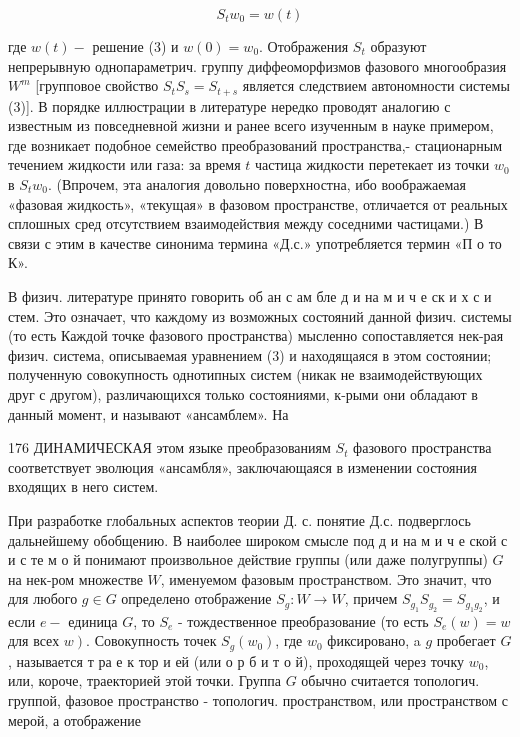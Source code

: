 \documentclass[10pt]{article}
\begin{document}
\[

S_{t} w_{0}=w(t)

\]



где $w(t)-$ решение (3) и $w(0)=w_{0}$. Отображения $S_{t}$ образуют непрерывную однопараметрич. группу диффеоморфизмов фазового многообразия $W^{m}$ [групповое свойство $S_{t} S_{s}=S_{t+s}$ является следствием автономности системы (3)]. В порядке иллюстрации в литературе нередко проводят аналогию с известным из повседневной жизни и ранее всего изученным в науке примером, где возникает подобное семейство преобразований пространства,- стационарным течением жидкости или газа: за время $t$ частица жидкости перетекает из точки $w_{0}$ в $S_{t} w_{0}$. (Впрочем, эта аналогия довольно поверхностна, ибо воображаемая «фазовая жидкость», «текущая» в фазовом пространстве, отличается от реальных сплошных сред отсутствием взаимодействия между соседними частицами.) В связи с этим в качестве синонима термина «Д.с.» употребляется термин «П о то К».



В физич. литературе принято говорить об ан с ам бле д и на м и ч е ск и х с и стем. Это означает, что каждому из возможных состояний данной физич. системы (то есть Каждой точке фазового пространства) мысленно сопоставляется нек-рая физич. система, описываемая уравнением (3) и находящаяся в этом состоянии; полученную совокупность однотипных систем (никак не взаимодействующих друг с другом), различающихся только состояниями, к-рыми они обладают в данный момент, и называют «ансамблем». На



176 ДИНАМИЧЕСКАЯ этом языке преобразованиям $S_{t}$ фазового пространства соответствует эволюция «ансамбля», заключающаяся в изменении состояния входящих в него систем.



При разработке глобальных аспектов теории Д. с. понятие Д.с. подверглось дальнейшему обобщению. В наиболее широком смысле под д и на м и ч е ской с и с те м о й понимают произвольное действие группы (или даже полугруппы) $G$ на нек-ром множестве $W$, именуемом фазовым пространством. Это значит, что для любого $g \in G$ определено отображение $S_{g}: W \rightarrow W$, причем $S_{g_{1}} S_{g_{2}}=S_{g_{1} g_{2}}$, и если $e-$ единица $G$, то $S_{e}$ - тождественное преобразование (то есть $S_{e}(w)=w$ для всех $\left.w\right)$. Совокупность точек $S_{g}\left(w_{0}\right)$, где $w_{0}$ фиксировано, a $g$ пробегает $G$, называется т ра е к тор и ей (или о р б и т о й), проходящей через точку $w_{0}$, или, короче, траекторией этой точки. Группа $G$ обычно считается топологич. группой, фазовое пространство - топологич. пространством, или пространством с мерой, а отображение
\end{document}
